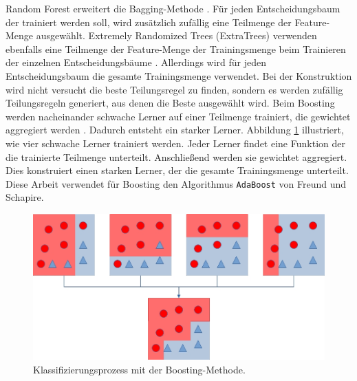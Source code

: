 \newline
\newline
Random Forest erweitert die Bagging-Methode \cite{breiman2001random}. Für jeden Entscheidungsbaum der trainiert werden soll, wird zusätzlich zufällig eine Teilmenge der Feature-Menge ausgewählt.
\newline
\newline
Extremely Randomized Trees (ExtraTrees) verwenden ebenfalls eine Teilmenge der Feature-Menge der Trainingsmenge beim Trainieren der einzelnen Entscheidungsbäume \cite{geurts2006extremely}.
Allerdings wird für jeden Entscheidungsbaum die gesamte Trainingsmenge verwendet. Bei der Konstruktion wird nicht versucht die beste Teilungsregel zu finden,
sondern es werden zufällig Teilungsregeln generiert, aus denen die Beste ausgewählt wird.
\newline
\newline
Beim Boosting werden nacheinander schwache Lerner auf einer Teilmenge trainiert, die gewichtet aggregiert werden \cite{freund1997decision}. Dadurch entsteht ein starker Lerner.
Abbildung \ref{fig:boosting} illustriert, wie vier schwache Lerner trainiert werden. Jeder Lerner findet eine Funktion der die trainierte Teilmenge unterteilt. Anschließend
werden sie gewichtet aggregiert. Dies konstruiert einen starken Lerner, der die gesamte Trainingsmenge unterteilt.
Diese Arbeit verwendet für Boosting den Algorithmus \texttt{AdaBoost} \cite{freund1997decision} von Freund und Schapire.
\begin{figure}[h!]
    \centering
    \includegraphics[width=\linewidth]{images/boosting.jpg}
    \caption{Klassifizierungsprozess mit der Boosting-Methode.}
    \label{fig:boosting}
\end{figure}